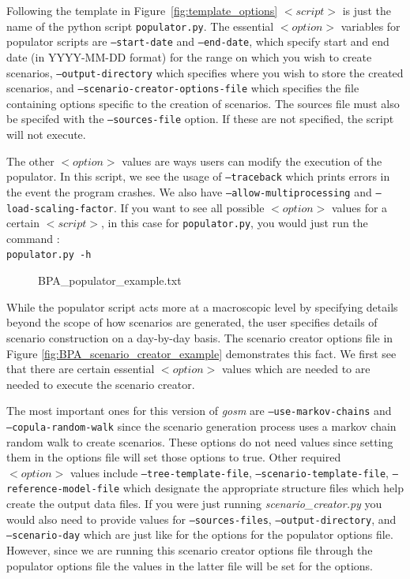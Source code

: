 \documentclass[11pt]{article}
\begin{document}
Following the template in Figure~\ref{fig:template_options} $<script>$ is just the name of the python script \texttt{populator.py}. The essential $<option>$ variables for populator scripts are \texttt{--start-date} and \texttt{--end-date}, which specify start and end date (in YYYY-MM-DD format) for the range on which you wish to create scenarios, \texttt{--output-directory} which specifies where you wish to store the created scenarios, and \texttt{--scenario-creator-options-file} which specifies the file containing options specific to the creation of scenarios. The sources file must also be specifed with the \texttt{--sources-file} option. If these are not specified, the script will not execute.

The other $<option>$ values are ways users can modify the execution of the populator. In this script, we see the usage of \texttt{--traceback} which prints errors in the event the program crashes. We also have   \texttt{--allow-multiprocessing} and \texttt{--load-scaling-factor}. If you want to see all possible $<option>$ values for a certain $<script>$, in this case for \texttt{populator.py}, you would just run the command : \\ \texttt{populator.py -h}



\begin{figure}
	\begin{framed}
		
	\end{framed}
	\caption{BPA\_populator\_example.txt}
	\label{BPA_populator}
\end{figure}

While the populator script acts more at a macroscopic level by specifying details beyond the scope of how scenarios are generated, the user specifies details of scenario construction on a day-by-day basis. The scenario creator options file in Figure \ref{fig:BPA_scenario_creator_example} demonstrates this fact. We first see that there are certain essential $<option>$ values which are needed to  are needed to execute the scenario creator.

The most important ones for this version of \textit{gosm} are \texttt{--use-markov-chains} and\\ \texttt{--copula-random-walk} since the scenario generation process uses a markov chain random walk to create scenarios. These options do not need values since setting them in the options file will set those options to true. Other required $<option>$ values include  \texttt{--tree-template-file}, \texttt{--scenario-template-file}, \texttt{--reference-model-file} which designate the appropriate structure files which help create the output data files. If you were just running \textit{scenario\_creator.py} you would also need to provide values for  \texttt{--sources-files},  \texttt{--output-directory}, and  \texttt{--scenario-day}  which are just like for the options for the populator options file. However, since we are running this scenario creator options file through the populator options file the values in the latter file will be set for the options.
\end{document}
